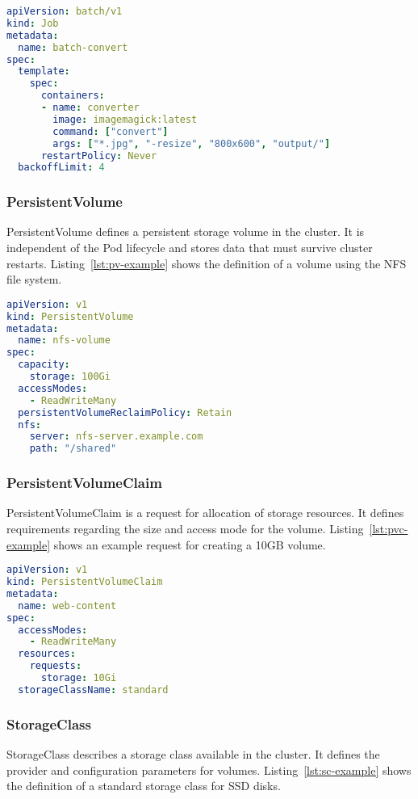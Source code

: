 \begin{lstlisting}[language=yaml,caption={Example Job definition},label={lst:job-example}]
apiVersion: batch/v1
kind: Job
metadata:
  name: batch-convert
spec:
  template:
    spec:
      containers:
      - name: converter
        image: imagemagick:latest
        command: ["convert"]
        args: ["*.jpg", "-resize", "800x600", "output/"]
      restartPolicy: Never
  backoffLimit: 4
\end{lstlisting}

\subsubsection{PersistentVolume}
PersistentVolume defines a persistent storage volume in the cluster.
It is independent of the Pod lifecycle and stores data that must survive cluster restarts.
Listing~\ref{lst:pv-example} shows the definition of a volume using the NFS file system.

\begin{lstlisting}[language=yaml,caption={Example PersistentVolume definition},label={lst:pv-example}]
apiVersion: v1
kind: PersistentVolume
metadata:
  name: nfs-volume
spec:
  capacity:
    storage: 100Gi
  accessModes:
    - ReadWriteMany
  persistentVolumeReclaimPolicy: Retain
  nfs:
    server: nfs-server.example.com
    path: "/shared"
\end{lstlisting}

\subsubsection{PersistentVolumeClaim}
PersistentVolumeClaim is a request for allocation of storage resources.
It defines requirements regarding the size and access mode for the volume.
Listing~\ref{lst:pvc-example} shows an example request for creating a 10GB volume.

\begin{lstlisting}[language=yaml,caption={Example PersistentVolumeClaim definition},label={lst:pvc-example}]
apiVersion: v1
kind: PersistentVolumeClaim
metadata:
  name: web-content
spec:
  accessModes:
    - ReadWriteMany
  resources:
    requests:
      storage: 10Gi
  storageClassName: standard
\end{lstlisting}

\subsubsection{StorageClass}
StorageClass describes a storage class available in the cluster.
It defines the provider and configuration parameters for volumes.
Listing~\ref{lst:sc-example} shows the definition of a standard storage class for SSD disks.

